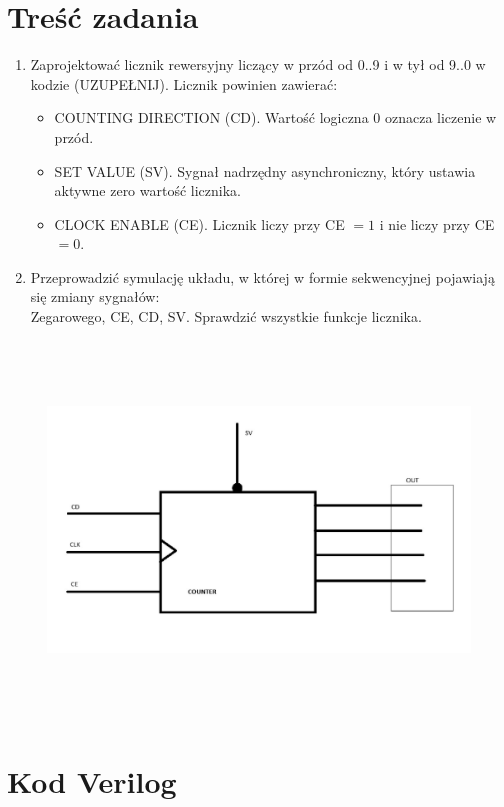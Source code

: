 \section*{Treść zadania}
\begin{enumerate}
    \item Zaprojektować licznik rewersyjny liczący w przód od 0..9 i w tył od 9..0 w kodzie (UZUPEŁNIJ). Licznik powinien zawierać:
    \begin{itemize}
        \item COUNTING DIRECTION (CD). Wartość logiczna 0 oznacza liczenie w przód.
        \item SET VALUE (SV). Sygnał nadrzędny asynchroniczny, który ustawia aktywne zero wartość licznika.
        \item CLOCK ENABLE (CE). Licznik liczy przy CE $ = 1$ i nie liczy przy CE $= 0$.
    \end{itemize}
    \item Przeprowadzić symulację układu, w której w formie sekwencyjnej pojawiają się zmiany sygnałów: \\
    Zegarowego, CE, CD, SV. Sprawdzić wszystkie funkcje licznika.
\end{enumerate}

\begin{figure}[!htb]
    \centering
    \includegraphics[height=10cm]{./images/Counter.jpg}
\end{figure}

\clearpage

\section{Kod Verilog}

